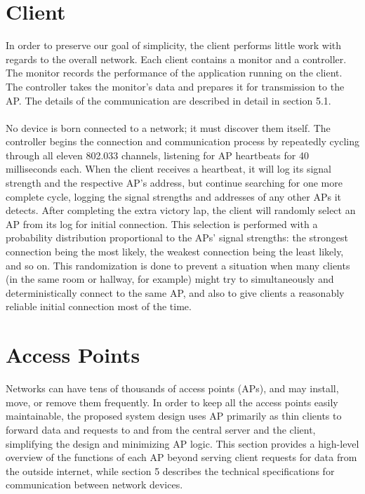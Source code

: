 \documentclass[10pt,journal,compsoc]{IEEEtran}
\begin{document}
		\section{Client}
		In order to preserve our goal of simplicity, the client performs little work with regards to the overall network. Each client contains a monitor and a controller. The monitor records the performance of the application running on the client. The controller takes the monitor's data and prepares it for transmission to the AP. The details of the communication are described in detail in section 5.1.\\
		\\
		No device is born connected to a network; it must discover them itself. The controller begins the connection and communication process by repeatedly cycling through all eleven 802.033 channels, listening for AP heartbeats for 40 milliseconds each. When the client receives a heartbeat, it will log its signal strength and the respective AP’s address, but continue searching for one more complete cycle, logging the signal strengths and addresses of any other APs it detects. After completing the extra victory lap, the client will randomly select an AP from its log for initial connection. This selection is performed with a probability distribution proportional to the APs' signal strengths: the strongest connection being the most likely, the weakest connection being the least likely, and so on. This randomization is done to prevent a situation when many clients (in the same room or hallway, for example) might try to simultaneously and deterministically connect to the same AP, and also to give clients a reasonably reliable initial connection most of the time.
		
		\section{Access Points}
		Networks can have tens of thousands of access points (APs), and may install, move, or remove them frequently. In order to keep all the access points easily maintainable, the proposed system design uses AP primarily as thin clients to forward data and requests to and from the central server and the client, simplifying the design and minimizing AP logic. This section provides a high-level overview of the functions of each AP beyond serving client requests for data from the outside internet, while section 5 describes the technical specifications for communication between network devices.
		
\end{document}
